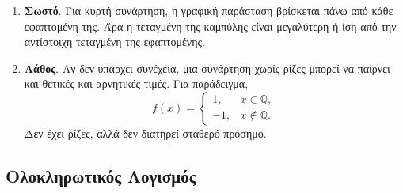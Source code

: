\begin{enumerate}[label=\textbf{2.\arabic*.}]
\item \textbf{Σωστό}. Για κυρτή συνάρτηση, η γραφική παράσταση βρίσκεται πάνω από κάθε εφαπτομένη της. Άρα η τεταγμένη της καμπύλης είναι μεγαλύτερη ή ίση από την αντίστοιχη τεταγμένη της εφαπτομένης.

\item \textbf{Λάθος}. Αν δεν υπάρχει συνέχεια, μια συνάρτηση χωρίς ρίζες μπορεί να παίρνει και θετικές και αρνητικές τιμές. Για παράδειγμα,
\[
f(x)=
\begin{cases}
1,&x\in\mathbb{Q},\\
-1,&x\notin\mathbb{Q}.
\end{cases}
\]
Δεν έχει ρίζες, αλλά δεν διατηρεί σταθερό πρόσημο.
\end{enumerate}

\subsection{Ολοκληρωτικός Λογισμός}

